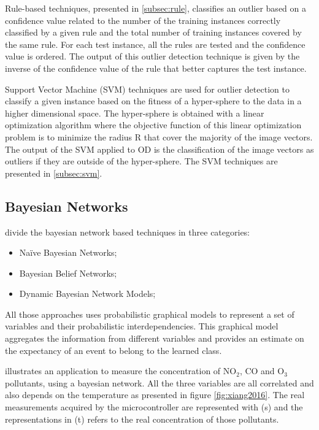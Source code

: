\vspace{0.5em}

Rule-based techniques, presented in \ref{subsec:rule}, classifies an outlier based on a confidence value related to the number of the training instances correctly classified by a given rule and the total number of training instances covered by the same rule. For each test instance, all the rules are tested and the confidence value is ordered. The output of this outlier detection technique is given by the inverse of the confidence value of the rule that better captures the test instance.

\vspace{0.5em}

Support Vector Machine (SVM) techniques are used for outlier detection to classify a given instance based on the fitness of a hyper-sphere to the data in a higher dimensional space. 
The hyper-sphere is obtained with a linear optimization algorithm where the objective function of this linear optimization problem is to minimize the radius R that cover the majority of the image vectors. The output of the SVM applied to OD is the classification of the image vectors as outliers if they are outside of the hyper-sphere. The SVM techniques are presented in \ref{subsec:svm}.

\newpage

\subsection{Bayesian Networks}
\label{subsec:bay}
\cite{gen:zhang:2010} divide the bayesian network based techniques in three categories: 

\begin{itemize}
	\setlength\itemsep{-0.5em}
	\item Na\"{i}ve Bayesian Networks;
	\item Bayesian Belief Networks;
	\item Dynamic Bayesian Network Models;	
\end{itemize}

All those approaches uses probabilistic graphical models to represent a set of variables and their probabilistic interdependencies. 
This graphical model aggregates the information from different variables and provides an estimate on the expectancy of an event to belong to the learned class.

\cite{class:xiang:2016} illustrates an application to measure the concentration of NO$_2$, CO and O$_3$ pollutants, using a bayesian network. All the three variables are all correlated and also depends on the temperature as presented in figure \ref{fig:xiang2016}. The real measurements acquired by the microcontroller are represented with (s) and the representations in (t) refers to the real concentration of those pollutants.

